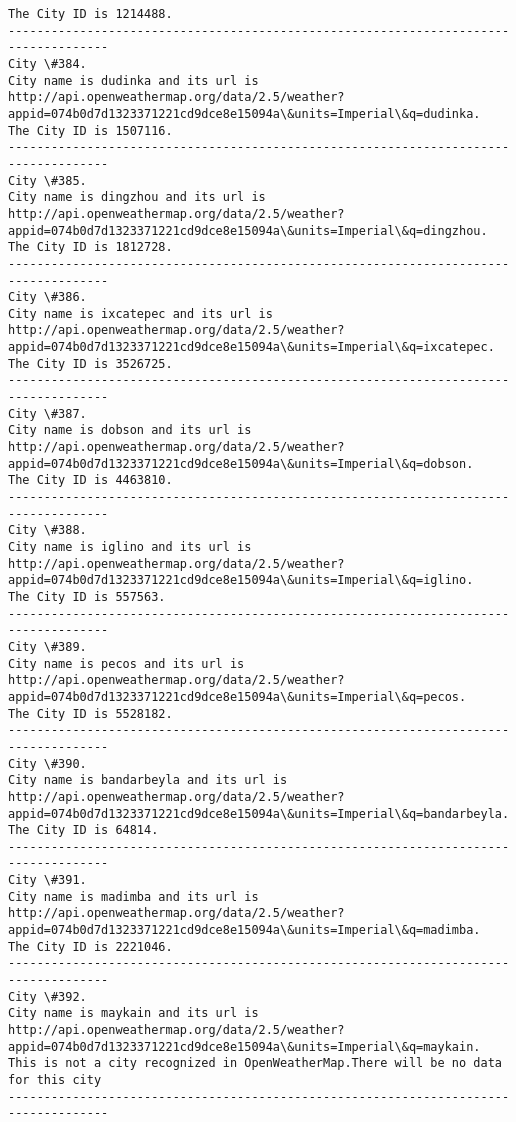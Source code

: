 \documentclass[11pt]{article}
\begin{document}
\begin{Verbatim}[commandchars=\\\{\}]
The City ID is 1214488.
------------------------------------------------------------------------------------
City \#384.
City name is dudinka and its url is http://api.openweathermap.org/data/2.5/weather?appid=074b0d7d1323371221cd9dce8e15094a\&units=Imperial\&q=dudinka.
The City ID is 1507116.
------------------------------------------------------------------------------------
City \#385.
City name is dingzhou and its url is http://api.openweathermap.org/data/2.5/weather?appid=074b0d7d1323371221cd9dce8e15094a\&units=Imperial\&q=dingzhou.
The City ID is 1812728.
------------------------------------------------------------------------------------
City \#386.
City name is ixcatepec and its url is http://api.openweathermap.org/data/2.5/weather?appid=074b0d7d1323371221cd9dce8e15094a\&units=Imperial\&q=ixcatepec.
The City ID is 3526725.
------------------------------------------------------------------------------------
City \#387.
City name is dobson and its url is http://api.openweathermap.org/data/2.5/weather?appid=074b0d7d1323371221cd9dce8e15094a\&units=Imperial\&q=dobson.
The City ID is 4463810.
------------------------------------------------------------------------------------
City \#388.
City name is iglino and its url is http://api.openweathermap.org/data/2.5/weather?appid=074b0d7d1323371221cd9dce8e15094a\&units=Imperial\&q=iglino.
The City ID is 557563.
------------------------------------------------------------------------------------
City \#389.
City name is pecos and its url is http://api.openweathermap.org/data/2.5/weather?appid=074b0d7d1323371221cd9dce8e15094a\&units=Imperial\&q=pecos.
The City ID is 5528182.
------------------------------------------------------------------------------------
City \#390.
City name is bandarbeyla and its url is http://api.openweathermap.org/data/2.5/weather?appid=074b0d7d1323371221cd9dce8e15094a\&units=Imperial\&q=bandarbeyla.
The City ID is 64814.
------------------------------------------------------------------------------------
City \#391.
City name is madimba and its url is http://api.openweathermap.org/data/2.5/weather?appid=074b0d7d1323371221cd9dce8e15094a\&units=Imperial\&q=madimba.
The City ID is 2221046.
------------------------------------------------------------------------------------
City \#392.
City name is maykain and its url is http://api.openweathermap.org/data/2.5/weather?appid=074b0d7d1323371221cd9dce8e15094a\&units=Imperial\&q=maykain.
This is not a city recognized in OpenWeatherMap.There will be no data for this city
------------------------------------------------------------------------------------

\end{Verbatim}
\end{document}
